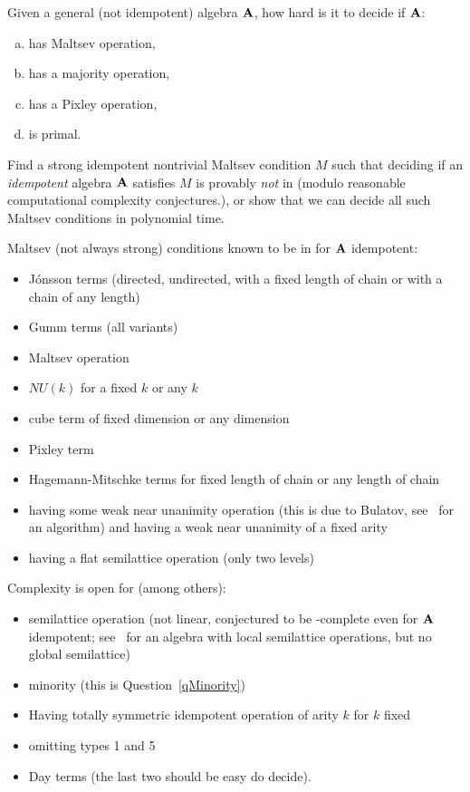 \begin{question}
  Given a general (not idempotent) algebra ${\mathbf{A}}$, how hard is it to decide if
  ${\mathbf{A}}$:
  \begin{enumerate}[a)]
    \item has Maltsev operation,
    \item has a majority operation,
    \item has a Pixley operation,
    \item is primal.
  \end{enumerate}
\end{question}
\begin{question}
  Find a strong idempotent nontrivial Maltsev condition $M$ such that deciding
  if an \emph{idempotent} algebra ${\mathbf{A}}$ satisfies $M$ is provably \emph{not}
  in \compP{} (modulo reasonable computational complexity conjectures.), or show
  that we can decide all such Maltsev conditions in polynomial time. 
\end{question}
\begin{context}
  Maltsev (not always strong) conditions known to be in \compP{} for ${\mathbf{A}}$
  idempotent:
  \begin{itemize}
    \item  Jónsson terms (directed, undirected, with a fixed length of chain
  or with a chain of any length)
     \item Gumm terms (all variants)
     \item Maltsev operation
     \item $NU(k)$ for a fixed $k$ or any $k$
     \item cube term of fixed dimension or any
  dimension
      \item Pixley term
      \item Hagemann-Mitschke terms for fixed length of chain or any length of
	chain
      \item having some weak near
	unanimity operation (this is due to Bulatov,
	see~\cite[Theorem 6.3]{freese-valeriote-complexity} for an algorithm) 
  and having a weak near unanimity of a fixed arity
      \item having a flat semilattice operation (only two levels)
  \end{itemize}

  Complexity is open for (among others):
  \begin{itemize}
    \item semilattice operation (not linear, conjectured to be
      \compEXPTIME-complete even for ${\mathbf{A}}$ idempotent;
      see~\cite{} for an
      algebra with local semilattice operations, but no global semilattice)
    \item minority (this is Question~\ref{qMinority})
    \item Having totally symmetric idempotent operation of arity $k$ for $k$
      fixed
    \item omitting types 1 and 5
    \item Day terms  (the last two should be easy do decide).
  \end{itemize}
\end{context}
